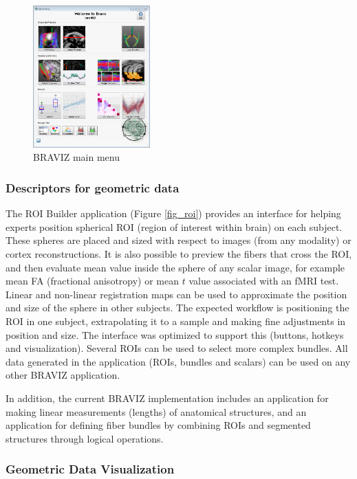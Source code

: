 \documentclass[twocolumn]{svjour3}
\begin{document}
\begin{figure}
\begin{center}
\includegraphics[width=0.4\textwidth]{braviz_menu}
\end{center}
 \caption{\label{fig_menu} BRAVIZ main menu }
\end{figure}


\subsubsection{Descriptors for geometric data}

The ROI Builder application (Figure \ref{fig_roi}) provides an interface for helping experts position spherical ROI  (region of interest within brain) on each subject. These spheres are placed and sized with respect to images (from any modality) or cortex reconstructions. It is also possible to preview the fibers that cross the ROI, and then evaluate mean value inside the sphere of any scalar image, for example mean FA (fractional anisotropy) or mean $t$ value associated with an fMRI test. 
Linear and non-linear registration maps can be used to approximate the position and size of the sphere in other subjects. The expected workflow is positioning the ROI in one subject, extrapolating it to a sample and making fine adjustments in position and size. The interface was optimized to support this (buttons, hotkeys and visualization). Several ROIs can be used to select more complex bundles. All data generated in the application (ROIs, bundles and scalars) can be used on any other BRAVIZ application. 

In addition, the current BRAVIZ implementation includes an application for making linear measurements (lengths) of anatomical structures, and an application for defining fiber bundles by combining ROIs and segmented structures through logical operations.


\subsubsection{Geometric Data Visualization}
\end{document}
